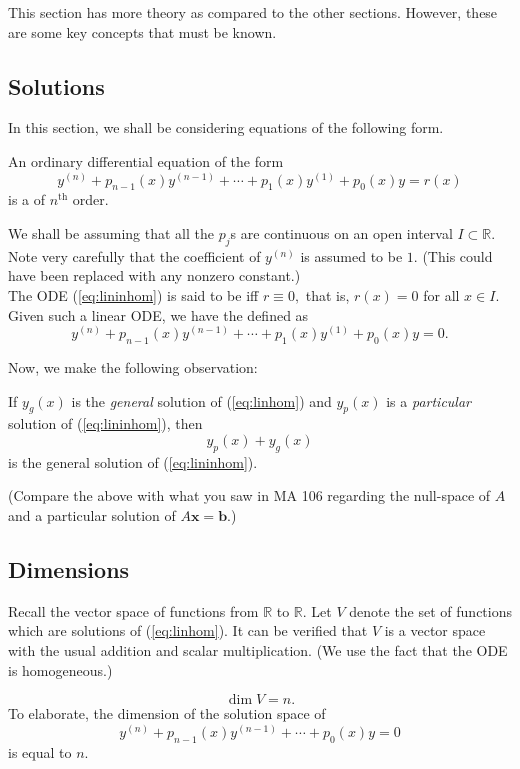 
This section has more theory as compared to the other sections. However, these are some key concepts that must be known.\\
\subsection{Solutions}
In this section, we shall be considering equations of the following form.
\begin{defn}
	An ordinary differential equation of the form
	\begin{equation} \label{eq:lininhom}
		y^{(n)} + p_{n-1}(x)y^{(n-1)} + \cdots + p_1(x)y^{(1)} + p_0(x)y = r(x)
	\end{equation}
	is a  of $n^{\text{th}}$ order.
\end{defn}
We shall be assuming that all the $p_j$s are continuous on an open interval $I \subset \mathbb{R}.$\\
Note very carefully that the coefficient of $y^{(n)}$ is assumed to be $1.$ (This could have been replaced with any nonzero constant.)\\
The ODE (\ref{eq:lininhom}) is said to be  iff $r \equiv 0,$ that is, $r(x) = 0$ for all $x \in I.$\\
Given such a linear ODE, we have the  defined as
\begin{equation} \label{eq:linhom}
	y^{(n)} + p_{n-1}(x)y^{(n-1)} + \cdots + p_1(x)y^{(1)} + p_0(x)y = 0.
\end{equation}

Now, we make the following observation:

\begin{mdframed}[style=boxstyle, frametitle={}]
	If $y_g(x)$ is the \emph{general} solution of (\ref{eq:linhom}) and $y_p(x)$ is a \emph{particular} solution of (\ref{eq:lininhom}), then
	\[y_p(x) + y_g(x)\]
	is the general solution of (\ref{eq:lininhom}).
\end{mdframed}
(Compare the above with what you saw in MA 106 regarding the null-space of $A$ and a particular solution of $A\mathbf{x} = \mathbf{b}$.)

\subsection{Dimensions}
Recall the vector space of functions from $\mathbb{R}$ to $\mathbb{R}$. Let $V$ denote the set of functions which are solutions of (\ref{eq:linhom}). It can be verified that $V$ is a vector space with the usual addition and scalar multiplication. (We use the fact that the ODE is homogeneous.)
\begin{thm} 
	\[\dim V = n.\] 
	To elaborate, the dimension of the solution space of
	\[y^{(n)} + p_{n-1}(x)y^{(n-1)} + \cdots + p_0(x)y = 0\]
	is equal to $n.$
\end{thm}

